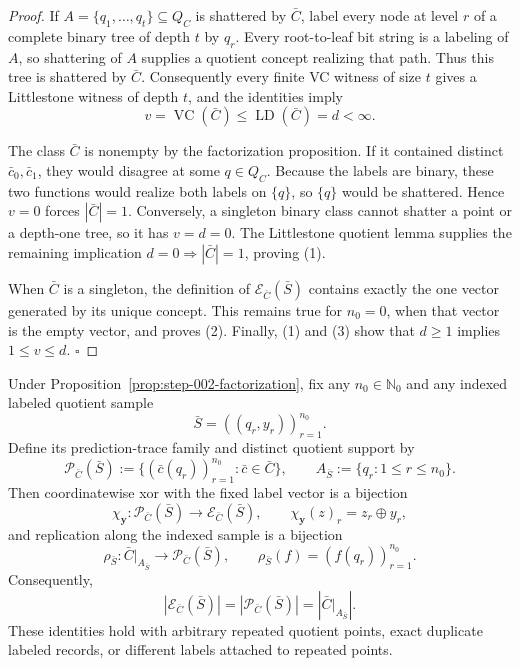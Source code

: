 \begin{proof}
If \(A=\{q_1,\ldots,q_t\}\subseteq Q_C\) is shattered by
\(\bar C\), label every node at level \(r\) of a complete binary tree of
depth \(t\) by \(q_r\).  Every root-to-leaf bit string is a labeling of
\(A\), so shattering of \(A\) supplies a quotient concept realizing that
path.  Thus this tree is shattered by \(\bar C\).  Consequently every
finite VC witness of size \(t\) gives a Littlestone witness of depth \(t\),
and the  identities imply
\[
v=\operatorname{VC}(\bar C)
\le \operatorname{LD}(\bar C)=d<\infty.
\tag{3}
\]

The class \(\bar C\) is nonempty by the  factorization proposition.
If it contained distinct \(\bar c_0,\bar c_1\), they would disagree at some
\(q\in Q_C\).  Because the labels are binary, these two functions would
realize both labels on \(\{q\}\), so \(\{q\}\) would be shattered.  Hence
\(v=0\) forces \(|\bar C|=1\).  Conversely, a singleton binary class cannot
shatter a point or a depth-one tree, so it has \(v=d=0\).  The 
Littlestone quotient lemma supplies the remaining implication
\(d=0\Rightarrow|\bar C|=1\), proving (1).

When \(\bar C\) is a singleton, the definition of
\(\mathcal E_{\bar C}(\bar S)\) contains exactly the one vector generated by
its unique concept.  This remains true for \(n_0=0\), when that vector is
the empty vector, and proves (2).  Finally, (1) and (3) show that \(d\ge1\)
implies \(1\le v\le d\). \(\square\)


\end{proof}

\begin{proposition}\label{prop:step-005-xor}
Under Proposition~\ref{prop:step-002-factorization}, fix any
\(n_0\in\mathbb N_0\) and any indexed labeled quotient sample
\[
\bar S=((q_r,y_r))_{r=1}^{n_0}.
\]
Define its prediction-trace family and distinct quotient support by
\[
\mathcal P_{\bar C}(\bar S)
:=\{(\bar c(q_r))_{r=1}^{n_0}:\bar c\in\bar C\},
\qquad
A_{\bar S}:=\{q_r:1\le r\le n_0\}.
\tag{4}
\]
Then coordinatewise xor with the fixed label vector is a bijection
\[
\chi_{\mathbf y}:\mathcal P_{\bar C}(\bar S)
\longrightarrow\mathcal E_{\bar C}(\bar S),
\qquad
\chi_{\mathbf y}(z)_r=z_r\oplus y_r,
\tag{5}
\]
and replication along the indexed sample is a bijection
\[
\rho_{\bar S}:\bar C|_{A_{\bar S}}
\longrightarrow\mathcal P_{\bar C}(\bar S),
\qquad
\rho_{\bar S}(f)=(f(q_r))_{r=1}^{n_0}.
\tag{6}
\]
Consequently,
\[
|\mathcal E_{\bar C}(\bar S)|
=|\mathcal P_{\bar C}(\bar S)|
=\left|\bar C|_{A_{\bar S}}\right|.
\tag{7}
\]
These identities hold with arbitrary repeated quotient points, exact
duplicate labeled records, or different labels attached to repeated points.


\end{proposition}

